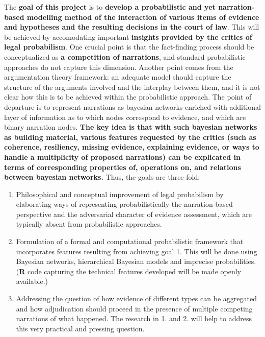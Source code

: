 \documentclass[11pt,dvipsnames,enabledeprecatedfontcommands]{scrartcl}
\begin{document}
The \textbf{goal of this project} is to
\textbf{develop  a probabilistic and yet narration-based  modelling method of the  interaction of various items of evidence and hypotheses and the resulting decisions in the court of law}.
This will be achieved by accomodating important
\textbf{insights provided by the critics of legal probabilism}. One
crucial point is that the fact-finding process should be conceptualized
as \textbf{a competition of narrations}, and standard probabilistic
approaches do not capture this dimension. Another point comes from the
argumentation theory framework: an adequate model should capture the
structure of the arguments involved and the interplay between them, and
it is not clear how this is to be achieved within the probabilistic
approach. The point of departure is to represent narrations as bayesian
networks enriched with additional layer of information as to which nodes
correspond to evidence, and which are binary narration nodes.
\textbf{The key idea is that with such bayesian networks as building material, various features requested by the critics (such as coherence, resiliency, missing evidence,  explaining evidence, or ways to handle a multiplicity of proposed narrations) can be explicated in terms of corresponding properties of,  operations on, and relations between bayesian networks.}
Thus, the goals are three-fold:

\begin{enumerate}
\def\labelenumi{\arabic{enumi}.}
\item
  Philosophical and conceptual improvement of legal probabilism by
  elaborating ways of representing probabilistically the narration-based
  perspective and the adversarial character of evidence assessment,
  which are typically absent from probabilistic approaches.
\item
  Formulation of a formal and computational probabilistic framework that
  incorporates features resulting from achieving goal 1. This will be
  done using Bayesian networks, hierarchical Bayesian models and
  imprecise probabilities. (\textbf{\textsf{R}} code capturing the
  technical features developed will be made openly available.)
\item
  Addressing the question of how evidence of different types can be
  aggregated and how adjudication should proceed in the presence of
  multiple competing narrations of what happened. The research in 1. and
  2. will help to address this very practical and pressing question.
\end{enumerate}
\end{document}

